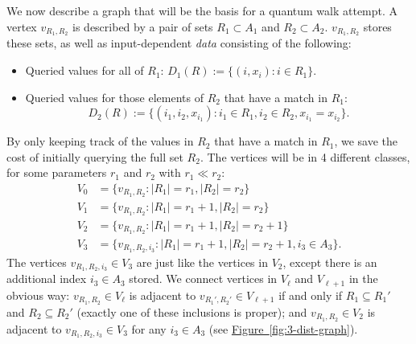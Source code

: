 \documentclass{theoretics}
\newcommand{\fig}[1]{\hyperref[fig:#1]{Figure~\ref*{fig:#1}}}
\renewcommand{\>}{\rangle}
\newcommand{\<}{\langle}
\renewcommand{\(}{\left(}
\renewcommand{\)}{\right)}
\begin{document}
We now describe a graph that will be the basis for a quantum walk attempt. A vertex $v_{R_1,R_2}$ is described by a pair of sets $R_1\subset A_1$ and $R_2\subset A_2$.  $v_{R_1,R_2}$ stores these sets, as well as input-dependent \emph{data} consisting of the following:
\begin{itemize}
\item Queried values for all of $R_1$: $D_1(R):=\{(i,x_i):i\in R_1\}$.
\item Queried values for those elements of $R_2$ that have a match in $R_1$:
\[D_2(R):=\{(i_1,i_2,x_{i_1}): i_1\in R_1, i_2\in R_2, x_{i_1}=x_{i_2}\}.\]
\end{itemize}By only keeping track of the values in $R_2$ that have a match in $R_1$, we save the cost of initially querying the full set $R_2$.
The vertices will be in 4 different classes, for some parameters $r_1$ and $r_2$ with $r_1\ll r_2$:
\begin{align*}
V_0 &=\{v_{R_1,R_2}: |R_1|=r_1, |R_2|=r_2\}\\
V_1 &= \{v_{R_1,R_2}: |R_1|=r_1+1, |R_2|=r_2\}\\
V_2 &= \{v_{R_1,R_2}: |R_1|=r_1+1, |R_2|=r_2+1\}\\
V_3 &= \{v_{R_1,R_2,i_3}: |R_1|=r_1+1, |R_2|=r_2+1, i_3\in A_3\}.
\end{align*}
The vertices $v_{R_1,R_2,i_3}\in V_3$ are just like the vertices in $V_2$, except there is an additional index $i_3\in A_3$ stored. We connect vertices in $V_{\ell}$ and $V_{\ell+1}$ in the obvious way: $v_{R_1,R_2}\in V_{\ell}$ is adjacent to $v_{R_1',R_2'}\in V_{\ell+1}$ if and only if $R_1\subseteq R_1'$ and $R_2\subseteq R_2'$ (exactly one of these inclusions is proper); and $v_{R_1,R_2}\in V_2$ is adjacent to $v_{R_1,R_2,i_3}\in V_3$ for any $i_3\in A_3$ (see \fig{3-dist-graph}).
\end{document}
